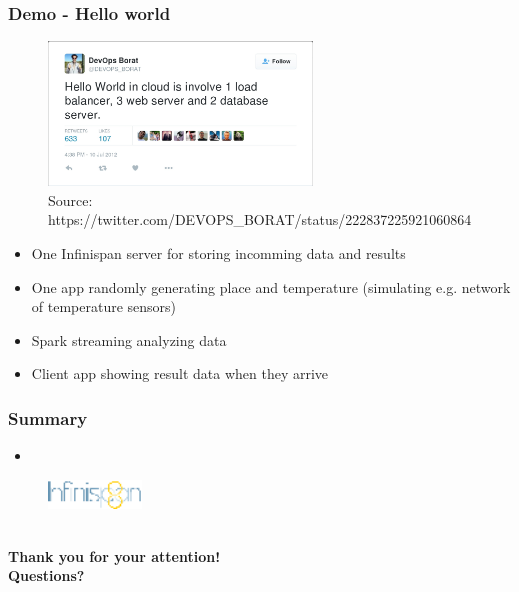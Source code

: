 \documentclass[10pt,utf8]{beamer}
\begin{document}
\begin{frame}
	\frametitle{Demo - Hello world}
	\begin{figure}
		\centering
		\includegraphics[width=7cm]{./img/borat_hello_world.eps}
		\caption{\tiny{Source: https://twitter.com/DEVOPS\_BORAT/status/222837225921060864}}
	\end{figure}
	
	\begin{itemize}
	 \item One Infinispan server for storing incomming data and results
	 \item One app randomly generating place and temperature (simulating e.g. network of temperature sensors)
	 \item Spark streaming analyzing data 
	 \item Client app showing result data when they arrive
	\end{itemize}
\end{frame}

\begin{frame}
	\frametitle{Summary}
	\begin{itemize}
	 \item 
	\end{itemize}
\end{frame}

\begin{frame}
	\begin{figure}
		\centering
		\includegraphics[width=2.5cm]{./img/infinispan8.eps}
	\end{figure}
	\centering
	\large{} \\
	\vspace{1cm}
	\huge{\textbf{Thank you for your attention!}} \\
	\vspace{1cm}
	\huge{\textbf{Questions?}}
\end{frame}
\end{document}
